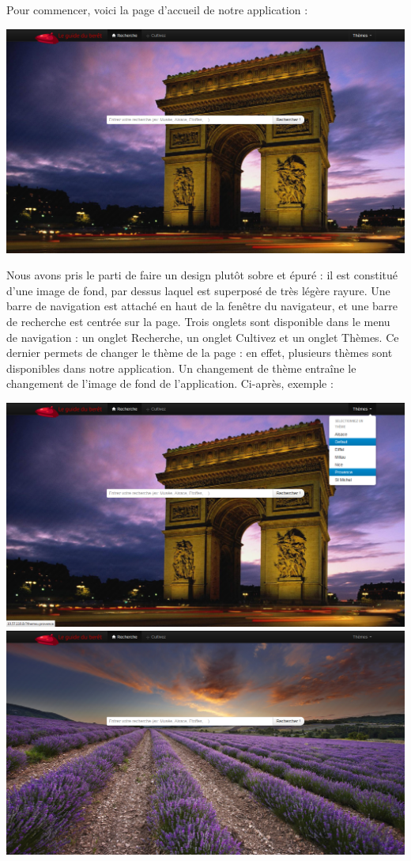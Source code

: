 \documentclass[12pt, a4paper]{article}
\newcommand{\espace}{\vspace{.8cm}}
\begin{document}
\espace{}
Pour commencer, voici la page d'accueil de notre application : 
\espace{}
\begin{center}
\includegraphics[width=.9\textwidth, keepaspectratio=true]{img/accueil.png}
\end{center}
\espace{}
Nous avons pris le parti de faire un design plutôt sobre et épuré : il est constitué d'une image de fond, par dessus laquel est superposé de très légère rayure. Une barre de navigation est attaché en haut de la fenêtre du navigateur, et une barre de recherche est centrée sur la page. Trois onglets sont disponible dans le menu de navigation : un onglet \og{}Recherche\fg{}, un onglet \og{}Cultivez\fg{} et un onglet \og{}Thèmes\fg{}. Ce dernier permets de changer le thème de la page : en effet, plusieurs thèmes sont disponibles dans notre application. Un changement de thème entraîne le changement de l'image de fond de l'application. Ci-après, exemple : 
\espace{}
\begin{center}
\includegraphics[width=.9\textwidth, keepaspectratio=true]{img/accueil3.png}
\espace{}
\includegraphics[width=.9\textwidth, keepaspectratio=true]{img/accueil2.png}
\end{center}
\end{document}
